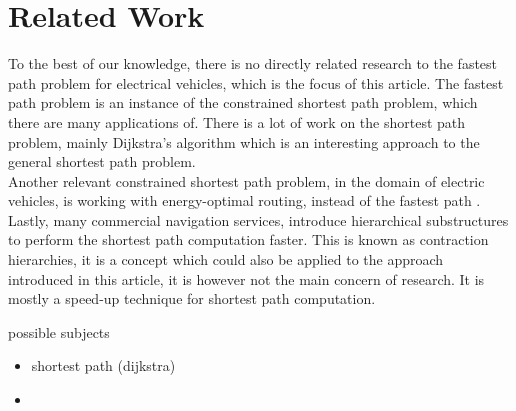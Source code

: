 \section{Related Work}\label{sec:relatedwork}
To the best of our knowledge, there is no directly related research to the fastest path problem for electrical vehicles, which is the focus of this article. The fastest path problem is an instance of the constrained shortest path problem, which there are many applications of. There is a lot of work on the shortest path problem, mainly Dijkstra's algorithm \cite{dijkstra1959note} which is an interesting approach to the general shortest path problem.\\

Another relevant constrained shortest path problem, in the domain of electric vehicles, is working with energy-optimal routing, instead of the fastest path \cite{artmeier2010shortest}.\\

Lastly, many commercial navigation services, introduce hierarchical substructures to perform the shortest path computation faster. This is known as contraction hierarchies, it is a concept which could also be applied to the approach introduced in this article, it is however not the main concern of research. It is mostly a speed-up technique for shortest path computation.




possible subjects
\begin{itemize}
    \item shortest path (dijkstra)
    \item 
\end{itemize}
